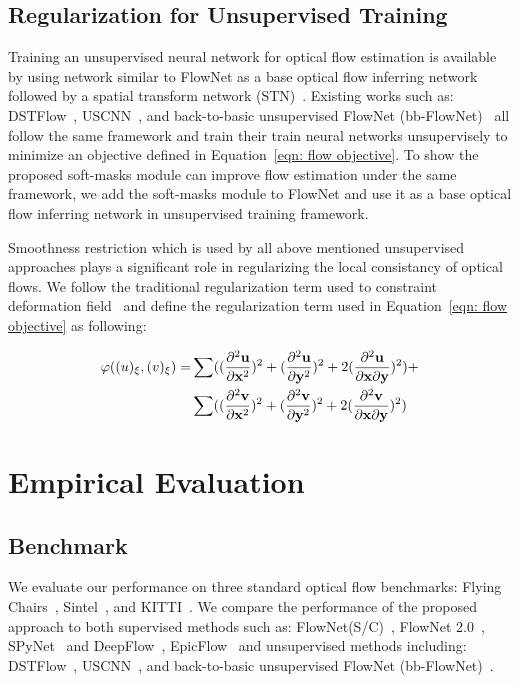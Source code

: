 \documentclass[10pt,twocolumn,letterpaper]{article}
\begin{document}
\subsection{Regularization for Unsupervised Training}
Training an unsupervised neural network for optical flow estimation is available by using network similar to FlowNet as a base optical flow inferring network followed by a spatial transform network (STN)~\cite{jaderberg2015spatial}. Existing works such as: DSTFlow~\cite{ren2017unsupervised}, USCNN~\cite{ahmadi2016unsupervised}, and back-to-basic unsupervised FlowNet (bb-FlowNet)~\cite{DBLP:journals/corr/YuHD16} all follow the same framework and train  their train neural networks unsupervisely to minimize an objective defined in Equation~\ref{eqn: flow objective}.  To show the proposed soft-masks module can improve flow estimation under the same framework, we add the soft-masks module to FlowNet and use it as a base optical flow inferring network in unsupervised training framework.

Smoothness restriction which is used by all above mentioned unsupervised approaches plays a significant role in regularizing the local consistancy of optical flows.  We follow the traditional regularization term used to constraint deformation field~\cite{rohlfing2003volume}\cite{ashburner1999nonlinear} and define the regularization term used in Equation~\ref{eqn: flow objective} as following:

\begin{align*}
\varphi(\bold(u)_{\xi}, \bold(v)_{\xi}) = & \sum ((\frac{\partial^2\bold{u}}{\partial \bold{x}^2})^2+(\frac{\partial^2\bold{u}}{\partial \bold{y}^2})^2+2(\frac{\partial^2\bold{u}}{\partial \bold{x} \partial \bold{y}})^2) + \\ 
& \sum ((\frac{\partial^2\bold{v}}{\partial \bold{x}^2})^2+(\frac{\partial^2\bold{v}}{\partial \bold{y}^2})^2+2(\frac{\partial^2\bold{v}}{\partial \bold{x} \partial \bold{y}})^2)
\end{align*}


\section{Empirical Evaluation}
\label{sec: evaluation}
\subsection{Benchmark}
We evaluate our performance on three standard optical flow benchmarks: Flying Chairs~\cite{7410673},  Sintel~\cite{Butler:ECCV:2012}, and KITTI~\cite{geiger2012we}. We compare the performance of the proposed approach to both supervised methods such as: FlowNet(S/C)~\cite{7410673}, FlowNet 2.0~\cite{Ilg_2017_CVPR}, SPyNet~\cite{Ranjan_2017_CVPR} and DeepFlow~\cite{weinzaepfel2013deepflow}, EpicFlow~\cite{revaud2015epicflow} and unsupervised methods including: DSTFlow~\cite{ren2017unsupervised}, USCNN~\cite{ahmadi2016unsupervised}, and back-to-basic unsupervised FlowNet (bb-FlowNet)~\cite{DBLP:journals/corr/YuHD16}. 
\end{document}
